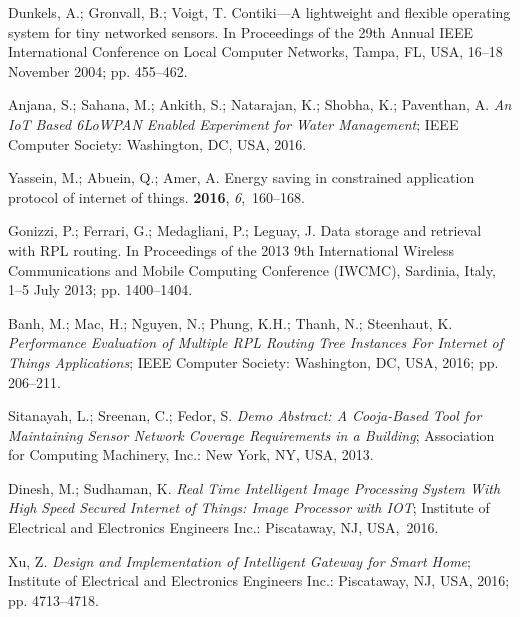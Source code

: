 \documentclass[symmetry,article,accept,moreauthors,pdftex10pt,a4paper]{mdpi}
\begin{document}
\begin{thebibliography}{999}
Dunkels, A.; Gronvall, B.; Voigt, T.
\newblock Contiki---A lightweight and flexible operating system for tiny
networked sensors.
\newblock In Proceedings of the 29th Annual IEEE International Conference on Local Computer
Networks,  Tampa, FL, USA, 16--18 November 2004; pp. 455--462.

Anjana, S.; Sahana, M.; Ankith, S.; Natarajan, K.; Shobha, K.; Paventhan, A.
\newblock \emph{An IoT Based 6LoWPAN Enabled Experiment for Water Management};
\newblock IEEE Computer Society: Washington, DC, USA, 2016.

Yassein, M.; Abuein, Q.; Amer, A.
\newblock Energy saving in constrained application protocol of internet of
things.
{\bf 2016}, {\em 6},~160--168.

Gonizzi, P.; Ferrari, G.; Medagliani, P.; Leguay, J.
\newblock Data storage and retrieval with RPL routing. In Proceedings of the 2013 9th International  Wireless Communications and Mobile Computing Conference (IWCMC),
\newblock  Sardinia, Italy, 1--5 July 2013; pp. 1400--1404.

Banh, M.; Mac, H.; Nguyen, N.; Phung, K.H.; Thanh, N.; Steenhaut, K.
\newblock \emph{Performance Evaluation of Multiple RPL Routing Tree Instances For
	Internet of Things Applications};
\newblock IEEE Computer Society: Washington, DC, USA, 2016; pp. 206--211.

Sitanayah, L.; Sreenan, C.; Fedor, S.
\newblock \emph{Demo Abstract: A Cooja-Based Tool for Maintaining Sensor Network
	Coverage Requirements in a Building};
\newblock Association for Computing Machinery, Inc.: New York, NY, USA, 2013.

Dinesh, M.; Sudhaman, K.
\newblock \emph{Real Time Intelligent Image Processing System With High Speed Secured
	Internet of Things: Image Processor with IOT};
\newblock Institute of Electrical and Electronics Engineers Inc.: Piscataway, NJ, USA,~2016.

Xu, Z.
\newblock \emph{Design and Implementation of Intelligent Gateway for Smart Home};
\newblock Institute of Electrical and Electronics Engineers Inc.: Piscataway, NJ, USA, 2016; pp.
4713--4718.


\end{thebibliography}
\end{document}
